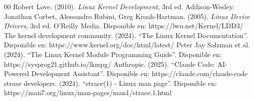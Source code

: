 \documentclass[conference]{IEEEtran}
\begin{document}
\begin{thebibliography}{00}
	 Robert Love. (2010). \textit{Linux Kernel Development}, 3rd ed. Addison-Wesley.
	 Jonathan Corbet, Alessandro Rubini, Greg Kroah-Hartman. (2005). \textit{Linux Device Drivers}, 3rd ed. O'Reilly Media. Disponible en: https://lwn.net/Kernel/LDD3/
	 The kernel development community. (2024). ``The Linux Kernel Documentation''. Disponible en: https://www.kernel.org/doc/html/latest/
	 Peter Jay Salzman et al. (2024). ``The Linux Kernel Module Programming Guide''. Disponible en: https://sysprog21.github.io/lkmpg/
	 Anthropic. (2025). ``Claude Code: AI-Powered Development Assistant''. Disponible en: https://claude.com/claude-code
	 strace developers. (2024). ``strace(1) - Linux man page''. Disponible en: https://man7.org/linux/man-pages/man1/strace.1.html
\end{thebibliography}
\end{document}
